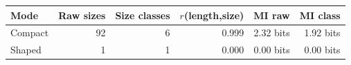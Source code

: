 \begin{tabular}{lrrrrr}
\toprule
\textbf{Mode} & \textbf{Raw sizes} & \textbf{Size classes} & \textbf{$r$(length,size)} & \textbf{MI raw} & \textbf{MI class} \\
\midrule
Compact & 92 & 6 & 0.999 & 2.32 bits & 1.92 bits \\
Shaped & 1 & 1 & 0.000 & 0.00 bits & 0.00 bits \\
\bottomrule
\end{tabular}
